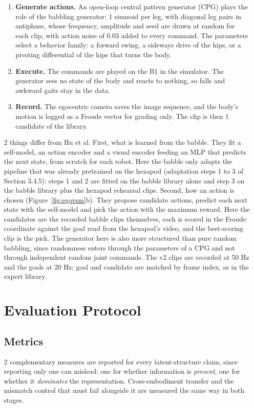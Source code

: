 \documentclass[12pt,a4paper,oneside]{report}
\begin{document}
\begin{enumerate}[label=\arabic*.]
\item \textbf{Generate actions.} An open-loop central pattern generator (CPG) plays the role of the babbling
  generator: 1 sinusoid per leg, with diagonal leg pairs in antiphase, whose frequency, amplitude and seed are drawn
  at random for each clip, with action noise of 0.03 added to every command. The parameters select a behavior
  family: a forward swing, a sideways drive of the hips, or a pivoting differential of the hips that turns the body.
\item \textbf{Execute.} The commands are played on the B1 in the simulator. The generator sees no state of the body
  and reacts to nothing, so falls and awkward gaits stay in the data.
\item \textbf{Record.} The egocentric camera saves the image sequence, and the body's motion is logged as a Froude
  vector for grading only. The clip is then 1 candidate of the library.
\end{enumerate}
2 things differ from Hu et al. First, what is learned from the babble. They fit a self-model, an action encoder and a
visual encoder feeding an MLP that predicts the next state, from scratch for each robot. Here the babble only adapts
the pipeline that was already pretrained on the hexapod (adaptation steps 1 to 3 of Section 3.4.5): steps 1 and 2 are
fitted on the babble library alone and step 3 on the babble library plus the hexapod rehearsal clips. Second, how an
action is chosen (Figure~\ref{fig:egovsm}b). They propose candidate actions, predict each next state with the
self-model and pick the action with the maximum reward. Here the candidates are the recorded babble clips themselves,
each is scored in the Froude coordinate against the goal read from the hexapod's video, and the best-scoring clip is
the pick. The generator here is also more structured than pure random babbling, since randomness enters through the
parameters of a CPG and not through independent random joint commands. The v2 clips are recorded at 50 Hz and the goals at
20 Hz; goal and candidate are matched by frame index, as in the expert library.

\newpage
\section{Evaluation Protocol}

\subsection{Metrics}
2 complementary measures are reported for every latent-structure claim, since reporting only one can mislead:
one for whether information is \emph{present}, one for whether it \emph{dominates} the representation.
Cross-embodiment transfer and the mismatch control that must fail alongside it are measured the same way in both
stages.
\end{document}
